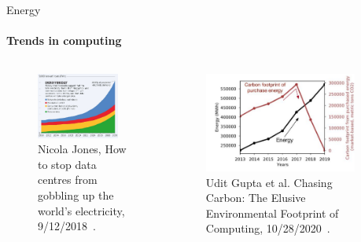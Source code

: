 \documentclass[notes, 10pt,xcolor=table]{beamer}
\begin{document}
\begin{frame}{Energy}
\framesubtitle{Trends in computing}
\begin{columns}
    \begin{column}{.5\textwidth}
        \begin{figure}
            \includegraphics[width=0.9\textwidth]{img/energyuse1.pdf}
            \caption{Nicola Jones, How to stop data centres from gobbling up the world’s electricity, 9/12/2018~\cite{nature1}.}
        \end{figure}
    \end{column}
    \begin{column}{.5\textwidth}
        \begin{figure}
            \includegraphics[width=0.9\textwidth]{img/energyuse2.pdf}
            \caption{Udit Gupta et al. Chasing Carbon: The Elusive Environmental Footprint of Computing, 10/28/2020~\cite{gupta2020chasing}.}
        \end{figure}
    \end{column}
    \end{columns}
\end{frame}
\end{document}
